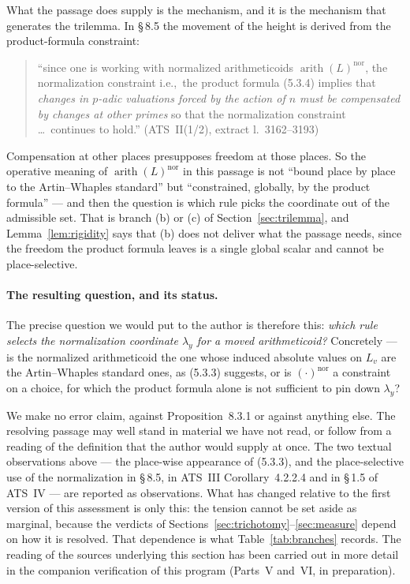 \documentclass[11pt,a4paper]{article}
\theoremstyle{definition}
\theoremstyle{plain}
\theoremstyle{definition}
\newcommand{\arith}{\operatorname{arith}}
\newcommand{\anchor}[2]{(#1, extract l.~#2)}
\begin{document}
What the passage does supply is the mechanism, and it is the mechanism that
generates the trilemma. In \S\,8.5 the movement of the height is derived from the
product-formula constraint:

\begin{quote}\small
``since one is working with normalized arithmeticoids $\arith(L)^{\mathrm{nor}}$,
the normalization constraint i.e.,\ the product formula (5.3.4) implies that
\emph{changes in $p$-adic valuations forced by the action of $n$ must be
compensated by changes at other primes} so that the normalization constraint
\ldots\ continues to hold.'' \hfill\anchor{ATS~II(1/2)}{3162--3193}
\end{quote}

Compensation at other places presupposes freedom at those places. So the operative
meaning of $\arith(L)^{\mathrm{nor}}$ in this passage is not ``bound place by
place to the Artin--Whaples standard'' but ``constrained, globally, by the product
formula'' --- and then the question is which rule picks the coordinate out of the
admissible set. That is branch (b) or (c) of Section~\ref{sec:trilemma}, and
Lemma~\ref{lem:rigidity} says that (b) does not deliver what the passage needs,
since the freedom the product formula leaves is a single global scalar and cannot
be place-selective.

\paragraph{The resulting question, and its status.}
The precise question we would put to the author is therefore this: \emph{which
rule selects the normalization coordinate $\lambda_y$ for a moved arithmeticoid?}
Concretely --- is the normalized arithmeticoid the one whose induced absolute
values on $L_v$ are the Artin--Whaples standard ones, as (5.3.3) suggests, or is
$(\cdot)^{\mathrm{nor}}$ a constraint on a choice, for which the product formula
alone is not sufficient to pin down $\lambda_y$?

We make no error claim, against Proposition~8.3.1 or against anything else. The
resolving passage may well stand in material we have not read, or follow from a
reading of the definition that the author would supply at once. The two textual
observations above --- the place-wise appearance of (5.3.3), and the
place-selective use of the normalization in \S\,8.5, in ATS~III Corollary~4.2.2.4
and in \S\,1.5 of ATS~IV --- are reported as observations. What has changed
relative to the first version of this assessment is only this: the tension cannot
be set aside as marginal, because the verdicts of
Sections~\ref{sec:trichotomy}--\ref{sec:measure} depend on how it is resolved.
That dependence is what Table~\ref{tab:branches} records. The reading of the
sources underlying this section has been carried out in more detail in the
companion verification of this program (Parts~V and~VI, in preparation).
\end{document}
